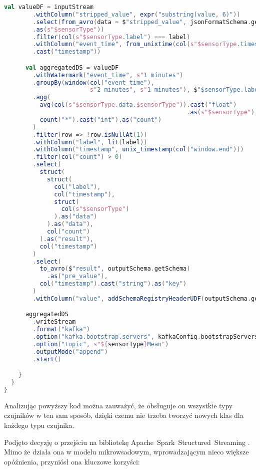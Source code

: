 \begin{lstlisting}[caption=Nowa implementacja przetwarzająca strumienie danych, label={lst:mean_processor_spark},language=Scala]
      val valueDF = inputStream
        .withColumn("stripped_value", expr("substring(value, 6)"))
        .select(from_avro(data = $"stripped_value", jsonFormatSchema.getSchema)
        .as(s"$sensorType"))
        .filter(col(s"$sensorType.label") === label)
        .withColumn("event_time", from_unixtime(col(s"$sensorType.timestamp"))
        .cast("timestamp"))

      val aggregatedDS = valueDF
        .withWatermark("event_time", s"1 minutes")
        .groupBy(window(col("event_time"), 
                        s"2 minutes", s"1 minutes"), $"$sensorType.label")
        .agg(
          avg(col(s"$sensorType.data.$sensorType")).cast("float")
                                                   .as(s"$sensorType"),
          count("*").cast("int").as("count")
        )
        .filter(row => !row.isNullAt(1))
        .withColumn("label", lit(label))
        .withColumn("timestamp", unix_timestamp(col("window.end")))
        .filter(col("count") > 0)
        .select(
          struct(
            struct(
              col("label"),
              col("timestamp"),
              struct(
                col(s"$sensorType")
              ).as("data")
            ).as("data"),
            col("count")
          ).as("result"),
          col("timestamp")
        )
        .select(
          to_avro($"result", outputSchema.getSchema)
            .as("pre_value"),
          col("timestamp").cast("string").as("key")
        )
        .withColumn("value", addSchemaRegistryHeaderUDF(outputSchema.getId)(col("pre_value")))

      aggregatedDS
        .writeStream
        .format("kafka")
        .option("kafka.bootstrap.servers", kafkaConfig.bootstrapServers)
        .option("topic", s"${sensorType}Mean")
        .outputMode("append")
        .start()

    }
  }
} 

\end{lstlisting}

Analizując powyższy kod można zauważyć, że obsługuje on wszystkie typy czujników w ten sam sposób, dzięki czemu nie trzeba tworzyć nowych klas dla każdego typu czujnika.

Podjęto decyzję o przejściu na bibliotekę \mbox{Apache Spark Structured Streaming} \cite{spark_streaming}. Mimo że działa ona w modelu mikrowsadowym, wprowadzającym nieco większe opóźnienia, przyniósł ona kluczowe korzyści:

\vspace{0.3em}

